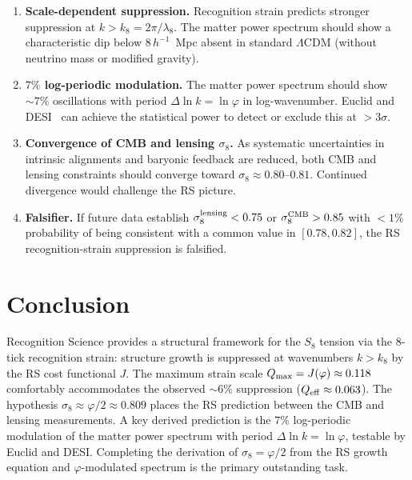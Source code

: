 \documentclass[12pt,a4paper]{article}
\theoremstyle{definition}
\theoremstyle{remark}
\begin{document}
\begin{enumerate}
  \item \textbf{Scale-dependent suppression.}  Recognition
  strain predicts stronger suppression at $k > k_8 =
  2\pi/\lambda_8$.  The matter power spectrum should show
  a characteristic dip below $8\,h^{-1}$~Mpc absent in
  standard $\Lambda$CDM (without neutrino mass or
  modified gravity).

  \item \textbf{$7\%$ log-periodic modulation.}  The matter power
  spectrum should show $\sim 7\%$ oscillations with period
  $\Delta\ln k = \ln\varphi$ in log-wavenumber.  Euclid and
  DESI~\cite{DESI2024} can achieve the statistical power to detect or
  exclude this at $> 3\sigma$.

  \item \textbf{Convergence of CMB and lensing $\sigma_8$.}  As
  systematic uncertainties in intrinsic alignments and baryonic
  feedback are reduced, both CMB and lensing constraints should
  converge toward $\sigma_8 \approx 0.80$--$0.81$.  Continued
  divergence would challenge the RS picture.

  \item \textbf{Falsifier.}  If future data establish
  $\sigma_8^{\rm lensing} < 0.75$ or $\sigma_8^{\rm CMB} > 0.85$
  with $< 1\%$ probability of being consistent with a common value
  in $[0.78, 0.82]$, the RS recognition-strain suppression is
  falsified.
\end{enumerate}

\section{Conclusion}
\label{sec:conclusion}

Recognition Science provides a structural framework for the $S_8$
tension via the 8-tick recognition strain: structure growth is
suppressed at wavenumbers $k > k_8$ by the RS cost functional $J$.
The maximum strain scale $Q_{\rm max} = J(\varphi) \approx 0.118$
comfortably accommodates the observed $\sim 6\%$ suppression
($Q_{\rm eff} \approx 0.063$).  The hypothesis $\sigma_8 \approx
\varphi/2 \approx 0.809$ places the RS prediction between the CMB
and lensing measurements.  A key derived prediction is the $7\%$
log-periodic modulation of the matter power spectrum with period
$\Delta\ln k = \ln\varphi$, testable by Euclid and DESI.  Completing
the derivation of $\sigma_8 = \varphi/2$ from the RS growth equation
and $\varphi$-modulated spectrum is the primary outstanding task.
\end{document}
